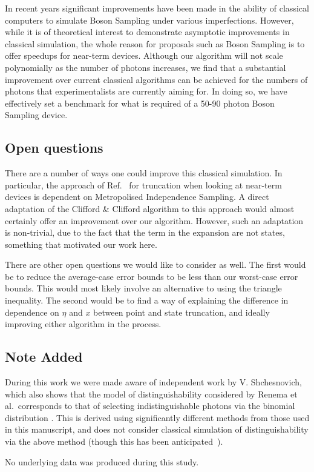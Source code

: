 In recent years significant improvements have been made in the ability of classical computers to simulate Boson Sampling under various imperfections. 
However, while it is of theoretical interest to demonstrate asymptotic improvements in classical simulation, the whole reason for proposals such as Boson Sampling is to offer speedups for near-term devices. 
Although our algorithm will not scale polynomially as the number of photons increases, we find that a substantial improvement over current classical algorithms can be achieved for the numbers of photons that experimentalists are currently aiming for. 
In doing so, we have effectively set a benchmark for what is required of a 50-90 photon Boson Sampling device.

\subsection{Open questions}

There are a number of ways one could improve this classical simulation. 
In particular, the approach of Ref.~\cite{renema2018} for truncation when looking at near-term devices is dependent on Metropolised Independence Sampling. 
A direct adaptation of the Clifford \& Clifford algorithm to this approach would almost certainly offer an improvement over our algorithm. 
However, such an adaptation is non-trivial, due to the fact that the term in the expansion are not states, something that motivated our work here.

There are other open questions we would like to consider as well. The first would be to reduce the average-case error bounds to be less than our worst-case error bounds. This would most likely involve an alternative to using the triangle inequality. The second would be to find a way of explaining the difference in dependence on $\eta$ and $x$ between point and state truncation, and ideally improving either algorithm in the process.


\subsection{Note Added}

During this work we were made aware of independent work by V. Shchesnovich, which also shows that the model of distinguishability considered by Renema et al.\ corresponds to that of selecting indistinguishable photons via the binomial distribution \cite{shchesnovich2019}. 
This is derived using significantly different methods from those used in this manuscript, and does not consider classical simulation of distinguishability via the above method (though this has been anticipated~\cite{shchesnovich2019clifford}).

No underlying data was produced during this study.